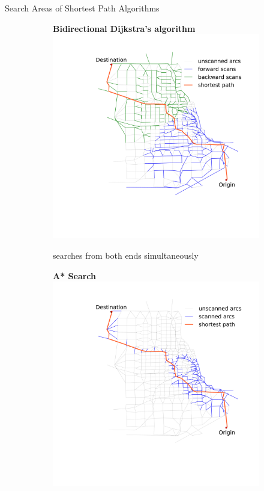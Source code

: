 \documentclass[final]{beamer}
\begin{document}
\begin{frame}{ }
\begin{columns}[t]
\begin{column}{.4\linewidth}
\begin{block}{Search Areas of Shortest Path Algorithms}
\begin{figure}
\begin{subfigure}{.5\linewidth}
                        \vspace{.1em}
                        \centering
                        {\bfseries Bidirectional Dijkstra's algorithm}
                        \includegraphics[width=\linewidth,trim=120px 280px 48px 60px,clip]{img/dijkstra_bidirect}
                        \caption{searches from \alert{both ends simultaneously}}
                    \end{subfigure}
                    \begin{subfigure}{.5\linewidth}
                        \centering
                        {\bfseries A* Search}
                        \includegraphics[width=\linewidth,trim=120px 280px 48px 60px,clip]{img/astar}

\end{subfigure}
\end{figure}
\end{block}
\end{column}
\end{columns}
\end{frame}
\end{document}
